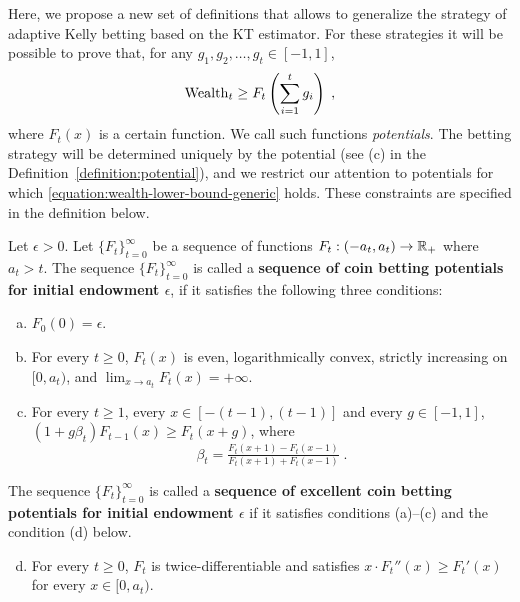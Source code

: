 Here, we propose a new set of definitions that allows to generalize the
strategy of adaptive Kelly betting based on the KT estimator. For these strategies
it will be possible to prove that, for any $g_1, g_2, \dots, g_t \in [-1,1]$,
\vspace{-0.3cm}
\begin{equation}
\label{equation:wealth-lower-bound-generic}
\operatorname{Wealth}_t \ge F_t \left( \sum_{i=1}^t g_i \right) \; ,
\end{equation}
where $F_t(x)$ is a certain function. We call such functions \emph{potentials}.
The betting strategy will be determined uniquely by the potential (see (c) in
the Definition~\ref{definition:potential}), and we restrict our attention to
potentials for which \eqref{equation:wealth-lower-bound-generic} holds. These
constraints are specified in the definition below.
\begin{definition}
\label{definition:potential}
Let $\epsilon > 0$. Let $\{F_t\}_{t=0}^\infty$ be a sequence of functions
$F_t:(-a_t, a_t)  \to \mathbb{R}_+$ where $a_t > t$.  The sequence
$\{F_t\}_{t=0}^\infty$ is called a \textbf{sequence of coin betting potentials
for initial endowment $\epsilon$}, if it satisfies the following three
conditions:
\begin{enumerate}[(a)]
\item $F_0(0) = \epsilon$.

\item For every $t \ge 0$, $F_t(x)$ is even, logarithmically convex, strictly
increasing on $[0,a_t)$, and
$\lim_{x \to a_t} F_t(x) = +\infty$.
\item For every $t \ge 1$, every $x \in [-(t-1), (t-1)]$ and every $g \in [-1,1]$, $\left(1 + g \beta_t \right) F_{t-1}(x) \ge F_t(x+g)$, where
\begin{equation}
\label{equation:potential-based-strategy}
\beta_t=\tfrac{F_t(x + 1) - F_t(x - 1)}{F_t(x + 1) + F_t(x - 1)} \;.
\end{equation}
\end{enumerate}
The sequence $\{F_t\}_{t=0}^\infty$ is called a
\textbf{sequence of excellent coin betting potentials for initial
endowment $\epsilon$} if it satisfies conditions (a)--(c) and the condition (d)
below.
\begin{enumerate}[(a)]
\setcounter{enumi}{3}
\item For every $t \ge 0$, $F_t$ is twice-differentiable and
satisfies $x \cdot F_t''(x) \ge F_t'(x)$ for every $x \in [0,a_t)$.
\end{enumerate}
\end{definition}
